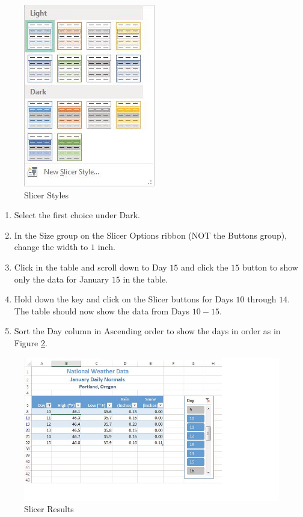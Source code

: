 \begin{figure}[H]
	\centering
	\includegraphics[width=\maxwidth{.95\linewidth}]{gfx/ch05_fig20}
	\caption{Slicer Styles}
	\label{05:fig20}
\end{figure}

\begin{enumerate}
	\item Select the first choice under Dark.
	\item In the Size group on the Slicer Options ribbon (NOT the Buttons group), change the width to $ 1 $ inch.
	\item Click in the table and scroll down to Day $ 15 $ and click the $ 15 $ button to show only the data for January $ 15 $ in the table.
	\item Hold down the  key and click on the Slicer buttons for Days $ 10 $ through $ 14 $. The table should now show the data from Days $ 10-15 $.
	\item Sort the Day column in Ascending order to show the days in order as in Figure \ref{05:fig21}.
\end{enumerate}

\begin{figure}[H]
	\centering
	\includegraphics[width=\maxwidth{.95\linewidth}]{gfx/ch05_fig21}
	\caption{Slicer Results}
	\label{05:fig21}
\end{figure}


